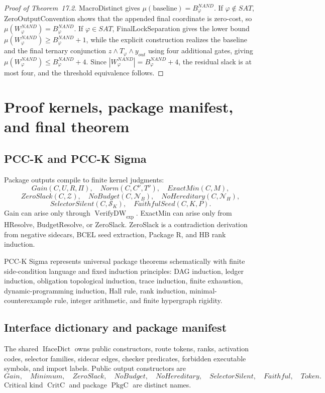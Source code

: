 \documentclass[10.5pt,a4paper]{article}
\newcommand{\VerifyDW}{\operatorname{VerifyDW}_{\exp}}
\newcommand{\IfaceDict}{\operatorname{IfaceDict}}
\newcommand{\CritC}{\operatorname{CritC}}
\newcommand{\PkgC}{\operatorname{PkgC}}
\begin{document}
\begin{proof}[Proof of Theorem~17.2]
MacroDistinct gives \(\mu(\text{baseline})=B^{NAND}_\varphi\).  If \(\varphi\notin SAT\), ZeroOutputConvention
shows that the appended final coordinate is zero-cost, so \(\mu(W^{NAND}_\varphi)=B^{NAND}_\varphi\).  If
\(\varphi\in SAT\), FinalLockSeparation gives the lower bound \(\mu(W^{NAND}_\varphi)\ge
B^{NAND}_\varphi+1\), while the explicit construction realizes the baseline and the final ternary conjunction
\(z\wedge T_\varphi\wedge y_{out}\) using four additional gates, giving \(\mu(W^{NAND}_\varphi)\le
B^{NAND}_\varphi+4\).  Since \(|W^{NAND}_\varphi|=B^{NAND}_\varphi+4\), the residual slack is at most four,
and the threshold equivalence follows.
\end{proof}

\section{Proof kernels, package manifest, and final theorem}

\subsection{PCC-K and PCC-K Sigma}
Package outputs compile to finite kernel judgments:
\[
Gain(C,U,R,\Pi),\quad Norm(C,C^\nu,T^\nu),\quad ExactMin(C,M),
\]
\[
ZeroSlack(C,\mathcal Z),\quad NoBudget(C,\mathcal N_B),\quad NoHereditary(C,\mathcal N_H),
\]
\[
SelectorSilent(C,\mathcal S_K),\quad FaithfulSeed(C,K,P).
\]
Gain can arise only through \(\VerifyDW\). ExactMin can arise only from HResolve, BudgetResolve, or ZeroSlack. ZeroSlack is a contradiction derivation from negative sidecars, BCEL seed extraction, Package R, and HB rank induction.

PCC-K Sigma represents universal package theorems schematically with finite side-condition language and fixed induction principles: DAG induction, ledger induction, obligation topological induction, trace induction, finite exhaustion, dynamic-programming induction, Hall rule, rank induction, minimal-counterexample rule, integer arithmetic, and finite hypergraph rigidity.

\subsection{Interface dictionary and package manifest}
The shared \(\IfaceDict\) owns public constructors, route tokens, ranks, activation codes, selector families, sidecar edges, checker predicates, forbidden executable symbols, and import labels. Public output constructors are
\[
Gain,
\quad Minimum,
\quad ZeroSlack,
\quad NoBudget,
\quad NoHereditary,
\quad SelectorSilent,
\quad Faithful,
\quad Token.
\]
Critical kind \(\CritC\) and package \(\PkgC\) are distinct names.
\end{document}
